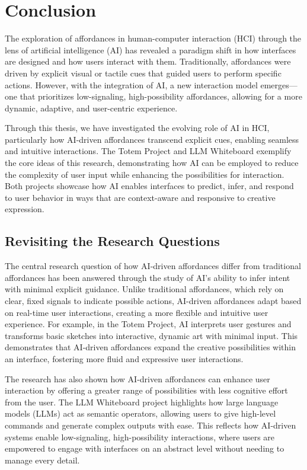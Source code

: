 \section{Conclusion}
The exploration of affordances in human-computer interaction (HCI) through the lens of artificial intelligence (AI) has revealed a paradigm shift in how interfaces are designed and how users interact with them.
Traditionally, affordances were driven by explicit visual or tactile cues that guided users to perform specific actions.
However, with the integration of AI, a new interaction model emerges—one that prioritizes low-signaling, high-possibility affordances, allowing for a more dynamic, adaptive, and user-centric experience.

Through this thesis, we have investigated the evolving role of AI in HCI, particularly how AI-driven affordances transcend explicit cues, enabling seamless and intuitive interactions.
The Totem Project and LLM Whiteboard exemplify the core ideas of this research, demonstrating how AI can be employed to reduce the complexity of user input while enhancing the possibilities for interaction.
Both projects showcase how AI enables interfaces to predict, infer, and respond to user behavior in ways that are context-aware and responsive to creative expression.

\subsection{Revisiting the Research Questions}
The central research question of how AI-driven affordances differ from traditional affordances has been answered through the study of AI’s ability to infer intent with minimal explicit guidance.
Unlike traditional affordances, which rely on clear, fixed signals to indicate possible actions, AI-driven affordances adapt based on real-time user interactions, creating a more flexible and intuitive user experience.
For example, in the Totem Project, AI interprets user gestures and transforms basic sketches into interactive, dynamic art with minimal input.
This demonstrates that AI-driven affordances expand the creative possibilities within an interface, fostering more fluid and expressive user interactions.

The research has also shown how AI-driven affordances can enhance user interaction by offering a greater range of possibilities with less cognitive effort from the user.
The LLM Whiteboard project highlights how large language models (LLMs) act as semantic operators, allowing users to give high-level commands and generate complex outputs with ease.
This reflects how AI-driven systems enable low-signaling, high-possibility interactions, where users are empowered to engage with interfaces on an abstract level without needing to manage every detail.

